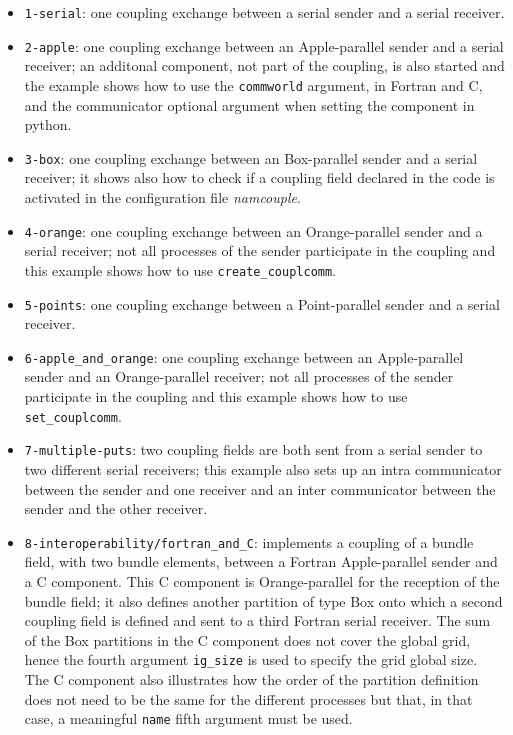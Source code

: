 \begin{itemize}

\item{{\tt 1-serial}}: one coupling exchange between a serial sender and a serial receiver.
\item{{\tt 2-apple}}: one coupling exchange between an Apple-parallel sender and a serial receiver; an additonal component, not part of the coupling, is also started and the example shows how to use the {\tt commworld} argument, in Fortran and C, and the communicator optional argument when setting the component in python.
\item{{\tt 3-box}}: one coupling exchange between an Box-parallel sender and a serial receiver; it shows also how to check if a coupling field declared in the code is activated in the configuration file {\it namcouple}.
\item{{\tt 4-orange}}: one coupling exchange between an Orange-parallel sender and a serial receiver; not all processes of the sender participate in the coupling and this example shows how to use {\tt create\_couplcomm}.
\item{{\tt 5-points}}: one coupling exchange between a Point-parallel sender and a serial receiver.
\item{{\tt 6-apple\_and\_orange}}: one coupling exchange between an Apple-parallel sender and an Orange-parallel receiver; not all processes of the sender participate in the coupling and this example shows how to use {\tt set\_couplcomm}.
\item{{\tt 7-multiple-puts}}: two coupling fields are both sent from a serial sender to two different serial receivers; this example also sets up an intra communicator between the sender and one receiver and an inter communicator between the sender and the other receiver.
\item{{\tt 8-interoperability/fortran\_and\_C}}: implements a coupling of a bundle field, with two bundle elements, between a Fortran Apple-parallel sender and a C component. This C component is Orange-parallel for the reception of the bundle field; it also defines another partition of type Box onto which a second coupling field is defined and sent to a third Fortran serial receiver. The sum of the Box partitions in the C component does not cover the global grid, hence the fourth argument {\tt ig\_size} is used to specify the grid global size. The C component also illustrates how the order of the partition definition does not need to be the same for the different processes but that, in that case, a meaningful {\tt name} fifth argument must be used.

\end{itemize}
